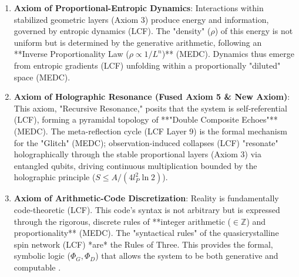 \documentclass[11pt, a4paper]{article}
\begin{document}
\begin{enumerate}
			\item \textbf{Axiom of Proportional-Entropic Dynamics}:
			Interactions within stabilized geometric layers (Axiom 3) produce energy and information, governed by entropic dynamics (LCF). The "density" ($\rho$) of this energy is not uniform but is determined by the generative arithmetic, following an **Inverse Proportionality Law ($\rho \propto 1/L^n$)** (MEDC). Dynamics thus emerge from entropic gradients (LCF) unfolding within a proportionally "diluted" space (MEDC).
			
			\item \textbf{Axiom of Holographic Resonance (Fused Axiom 5 \& New Axiom)}:
			This axiom, "Recursive Resonance," posits that the system is self-referential (LCF), forming a pyramidal topology of **"Double Composite Echoes"** (MEDC). The meta-reflection cycle (LCF Layer 9) is the formal mechanism for the "Glitch" (MEDC); observation-induced collapses (LCF) "resonate" holographically through the stable proportional layers (Axiom 3) via entangled qubits, driving continuous multiplication bounded by the holographic principle ($S \leq A/(4 l_P^2 \ln 2)$).
			
			\item \textbf{Axiom of Arithmetic-Code Discretization}:
			Reality is
			fundamentally code-theoretic (LCF). This code's syntax is not arbitrary but is expressed through the rigorous, discrete rules of **integer arithmetic ($\in \mathbb{Z}$) and proportionality** (MEDC). The "syntactical rules" of the quasicrystalline spin network (LCF) *are* the Rules of Three. This provides the formal, symbolic logic ($\Phi_G, \Phi_D$) that allows the system to be both generative and computable \cite{Garcez2023}.
			
		\end{enumerate}
		
\end{document}
